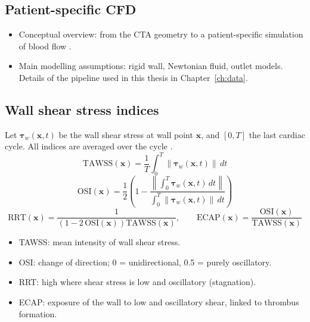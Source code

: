 \subsection{Patient-specific CFD}
\begin{itemize}
    \item Conceptual overview: from the CTA geometry to a patient-specific simulation of blood flow \cite{hu_computational_2025, mutlu_how_2023}.
    \item Main modelling assumptions: rigid wall, Newtonian fluid, outlet models. Details of the pipeline used in this thesis in Chapter~\ref{ch:data}.
\end{itemize}

\subsection{Wall shear stress indices}
\label{sec:wss-indices}
Let $\boldsymbol{\tau}_w(\mathbf{x},t)$ be the wall shear stress at wall point $\mathbf{x}$, and $[0,T]$ the last cardiac cycle.
All indices are averaged over the cycle \cite{mutlu_integrated_2026, katsoudas_hemodynamic_2026}.
\begin{equation}
    \mathrm{TAWSS}(\mathbf{x}) = \frac{1}{T}\int_0^T \lVert \boldsymbol{\tau}_w(\mathbf{x},t) \rVert \, dt
\end{equation}
\begin{equation}
    \mathrm{OSI}(\mathbf{x}) = \frac{1}{2}\left(1 - \frac{\left\lVert \int_0^T \boldsymbol{\tau}_w(\mathbf{x},t)\,dt \right\rVert}{\int_0^T \lVert \boldsymbol{\tau}_w(\mathbf{x},t) \rVert \, dt}\right)
\end{equation}
\begin{equation}
    \mathrm{RRT}(\mathbf{x}) = \frac{1}{\left(1 - 2\,\mathrm{OSI}(\mathbf{x})\right)\mathrm{TAWSS}(\mathbf{x})},
    \qquad
    \mathrm{ECAP}(\mathbf{x}) = \frac{\mathrm{OSI}(\mathbf{x})}{\mathrm{TAWSS}(\mathbf{x})}
\end{equation}
\begin{itemize}
    \item TAWSS: mean intensity of wall shear stress.
    \item OSI: change of direction; 0 = unidirectional, 0.5 = purely oscillatory.
    \item RRT: high where shear stress is low and oscillatory (stagnation).
    \item ECAP: exposure of the wall to low and oscillatory shear, linked to thrombus formation.
\end{itemize}

